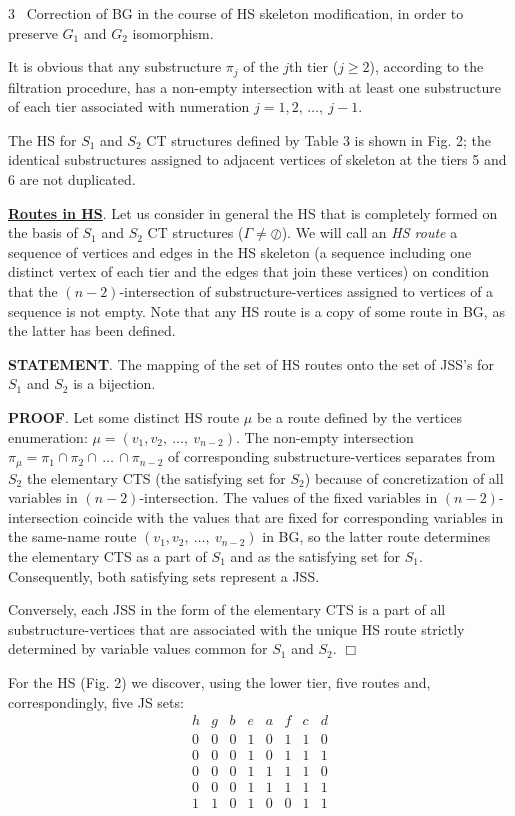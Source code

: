 \documentclass[12pt, a4paper]{article}
\begin{document}
\hangindent=1.1cm
3 \  Correction of BG in the course of HS skeleton modification, in order to preserve  $G_1$  and  $G_2$  isomorphism.

It is obvious that any substructure $\pi_j$ of the $j$th tier ($j\ge   2$), according to the filtration procedure, has a non-empty intersection with at least one substructure of each tier associated with numeration $j=1, 2, \,\dots,\ j-1$.

The HS for  $S_1$  and  $S_2$ CT structures defined by Table 3 is shown in Fig. 2; the identical substructures assigned to adjacent vertices of skeleton at the tiers 5 and 6 are not duplicated.

{\bf \underline {Routes in HS}}. Let us consider in general the HS that is completely formed on the basis of $S_1$ and $S_2$ CT structures ($\Gamma\ne \oslash$). We will call an {\it HS route} a sequence of vertices and edges in the HS skeleton (a sequence including one distinct vertex of each tier and the edges that join these vertices) on condition that the $(n-2)$-intersection of substructure-vertices assigned to vertices of a sequence is not empty. Note that any HS route is a copy of some route in BG, as the latter has been defined.

{\bf STATEMENT}. The mapping of the set of HS routes onto the set of JSS's for $S_1$ and $S_2$ is a bijection.

{\bf PROOF}. Let some distinct HS route $\mu $ be a route defined by the vertices enumeration: $\mu = (v_1, v_2, \ \dots ,\ v_{n-2})$.
The non-empty intersection $\pi_{\mu} = \pi_1\cap \pi_2\cap \,\ldots \, \cap \pi_{n-2}$ of corresponding
substructure-vertices separates from $S_2$ the elementary CTS (the satisfying set for $S_2$) because of concretization of all variables in $(n-2)$-intersection. The values of the fixed variables in $(n-2)$-intersection coincide with the values that are fixed for corresponding variables in the same-name route $(v_1, v_2, \ \dots ,\ v_{n-2})$ in BG, so the latter route determines the elementary CTS as a part of $S_1$ and as the satisfying set for $S_1$. Consequently, both satisfying sets represent a JSS.

Conversely, each JSS in the form of the elementary CTS is a part of all substructure-vertices that are associated with the unique HS route strictly determined by variable values common for  $S_1$ and  $S_2$. $\Box$

For the HS (Fig. 2) we discover, using the lower tier, five routes and, correspondingly, five JS sets:
$$
\begin{array}{cccccccc}
h&g&b&e&a&f&c&d\\[5pt]
0&0&0&1&0&1&1&0\\
0&0&0&1&0&1&1&1\\
0&0&0&1&1&1&1&0\\
0&0&0&1&1&1&1&1\\
1&1&0&1&0&0&1&1\\
\end{array}
$$
\end{document}
